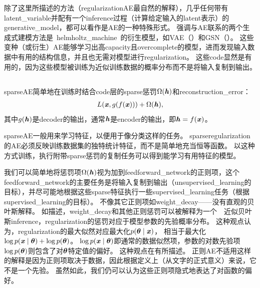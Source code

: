 除了这里所描述的方法（\gls{regularization}\gls{AE}最自然的解释），几乎任何带有\gls{latent_variable}并配有一个\gls{inference}过程（计算给定输入的\gls{latent}表示）的\gls{generative_model}，都可以看作是\gls{AE}的一种特殊形式。
强调与\gls{AE}联系的两个生成式建模方法是~\gls{helmholtz_machine}~\citep{Hinton95}的衍生模型，如\gls{VAE}（）和\gls{GSN}（）。
这些变种（或衍生）\gls{AE}能够学习出高\gls{capacity}且\gls{overcomplete}的模型，进而发现输入数据中有用的结构信息，并且也无需对模型进行\gls{regularization}。
这些\gls{code}显然是有用的，因为这些模型被训练为近似训练数据的概率分布而不是将输入复制到输出。 %


\subsection{}
\label{sec:sparse_autoencoders}
\gls{sparse}\gls{AE}简单地在训练时结合\gls{code}层的\gls{sparse}惩罚$\Omega(\boldsymbol{\mathit{h}})$和\gls{reconstruction_error}：
\begin{align}
    L(\boldsymbol{\mathit{x}}, g(f(\boldsymbol{\mathit{x}}))) + \Omega(\boldsymbol{\mathit{h}}),
\end{align}
其中$g(\boldsymbol{\mathit{h}})$是\gls{decoder}的输出，通常$\boldsymbol{\mathit{h}}$是\gls{encoder}的输出，即$\boldsymbol{\mathit{h}} = f(\boldsymbol{\mathit{x}})$。


\gls{sparse}\gls{AE}一般用来学习特征，以便用于像分类这样的任务。
\gls{sparse}\gls{regularization}的\gls{AE}必须反映训练数据集的独特统计特征，而不是简单地充当恒等函数。
以这种方式训练，执行附带\gls{sparse}惩罚的复制任务可以得到能学习有用特征的模型。


我们可以简单地将惩罚项$\Omega(\boldsymbol{\mathit{h}})$视为加到\gls{feedforward_network}的正则项，这个\gls{feedforward_network}的主要任务是将输入复制到输出（\gls{unsupervised_learning}的目标），并尽可能地根据这些\gls{sparse}特征执行一些\gls{supervised_learning}任务（根据\gls{supervised_learning}的目标）。
不像其它正则项如\gls{weight_decay}——没有直观的贝叶斯解释。
如描述，\gls{weight_decay}和其他正则惩罚可以被解释为一个~~近似贝叶斯\gls{inference}，\gls{regularization}的惩罚对应于模型参数的先验概率分布。
这种观点认为，\gls{regularization}的最大似然对应最大化$p(\boldsymbol{\theta} \mid \boldsymbol{\mathit{x}})$， 相当于最大化$\log p(\boldsymbol{\mathit{x}} \mid \boldsymbol{\theta}) + \log p(\boldsymbol{\theta})$。 $\log p(\boldsymbol{\mathit{x}} \mid \boldsymbol{\theta})$即通常的数据似然项，参数的对数先验项$\log p(\boldsymbol{\theta})$则包含了对$\boldsymbol{\theta}$特定值的偏好。
这种观点在有所描述。
正则\gls{AE}不适用这样的解释是因为正则项取决于数据，因此根据定义上（从文字的正式意义）来说，它不是一个先验。
虽然如此，我们仍可以认为这些正则项隐式地表达了对函数的偏好。

